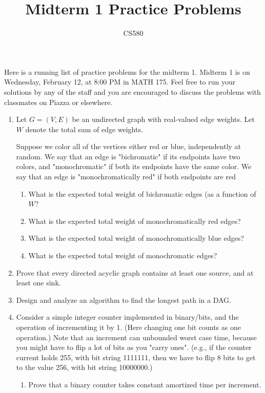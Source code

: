 \documentclass{article}
\title{Midterm 1 Practice Problems}
\author{CS580}
\begin{document}
\maketitle

Here is a running list of practice problems for the midterm 1. Midterm 1 is on Wednesday, February 12, at 8:00 PM in MATH 175. Feel free to run your solutions by any of the staff and you are encouraged to discuss the problems with classmates on Piazza or elsewhere.

\begin{enumerate}
    \item Let $G = (V,E)$ be an undirected graph with real-valued edge weights. Let $W$ denote the total sum of edge weights. 
    
    Suppose we color all of the vertices either red or blue, independently at random. We say that an edge is "bichromatic" if its endpoints have two colors, and "monochromatic" if both its endpoints have the same color. We say that an edge is "monochromatically red" if both endpoints are red
    \begin{enumerate}
        \item What is the expected total weight of bichromatic edges (as a function of $W$?
        \item What is the expected total weight of monochromatically red edges?
        \item What is the expected total weight of monochromatically blue edges?
        \item What is the expected total weight of monochromatic edges?
        \end{enumerate}
    \item Prove that every directed acyclic graph contains at least one source, and at least one sink.
    \item Design and analyze an algorithm to find the longest path in a DAG.
    \item Consider a simple integer counter implemented in binary/bits, and the operation of incrementing it by 1. (Here changing one bit counts as one operation.) Note that an increment can unbounded worst case time, because you might have to flip a lot of bits as you "carry ones". (e.g., if the counter current holds 255, with bit string 1111111, then we have to flip 8 bits to get to the value 256, with bit string 10000000.)
    \begin{enumerate} 
    \item Prove that a binary counter takes constant amortized time per increment.

\end{enumerate}
\end{enumerate}
\end{document}
